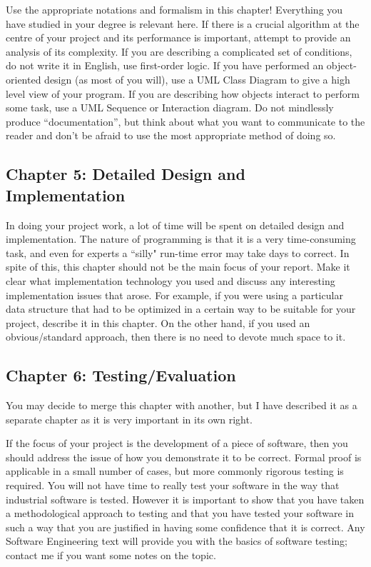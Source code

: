 \documentclass[]{final_report}
\begin{document}
Use the appropriate notations and formalism in this chapter! Everything you have studied in your degree is relevant here. If there is a crucial algorithm at the centre of your project and its performance is important, attempt to provide an analysis of its complexity. If you are describing a complicated set of conditions, do not write it in English, use first-order logic. If you have performed an object-oriented design (as most of you will), use a UML Class Diagram to give a high level view of your program. If you are describing how objects interact to perform some task, use a UML Sequence or Interaction diagram. Do not mindlessly produce ``documentation'', but think about what you want to communicate to the reader and don't be afraid to use the most appropriate method of doing so.

\subsection{Chapter 5: Detailed Design and Implementation}

In doing your project work, a lot of time will be spent on detailed design and implementation. The nature of programming is that it is a very time-consuming task, and even for experts a ``silly" run-time error may take days to correct. In spite of this, this chapter should not be the main focus of your report. Make it clear what implementation technology you used and discuss any interesting implementation issues that arose. For example, if you were using a particular data structure that had to be optimized in a certain way to be suitable for your project, describe it in this chapter. On the other hand, if you used an obvious/standard approach, then there is no need to devote much space to it.

\subsection{Chapter 6: Testing/Evaluation}

You may decide to merge this chapter with another, but I have described it as a separate chapter as it is very important in its own right.

If the focus of your project is the development of a piece of software, then you should address the issue of how you demonstrate it to be correct. Formal proof is applicable in a small number of cases, but more commonly rigorous testing is required. You will not have time to really test your software in the way that industrial software is tested. However it is important to show that you have taken a methodological approach to testing and that you have tested your software in such a way that you are justified in having some confidence that it is correct. Any Software Engineering text will provide you with the basics of software testing; contact me if you want some notes on the topic.
\end{document}
